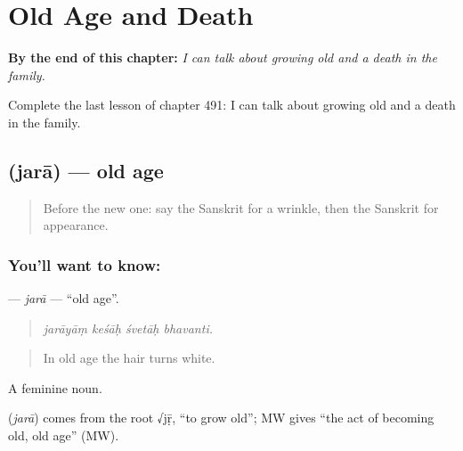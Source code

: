 
\chapter{Old Age and Death}
\label{ch:sa-old-age-and-death}

\begin{chapteropening}
\textbf{By the end of this chapter:} \emph{I can talk about growing old and a death in the family.}

Complete the last lesson of chapter 491: I can talk about growing old and a death in the family.
\end{chapteropening}

\section[\texorpdfstring{\sk{जरा} (jarā)}{जरा (jarā)}]{ (jarā) — old age}

\label{lesson:SA-C491-jara}



\begin{quote}
Before the new one: say the Sanskrit for a wrinkle, then the Sanskrit for appearance.
\end{quote}

\subsection*{You'll want to know: }
\textbf{} — \emph{jarā} — \textquotedblleft{}old age\textquotedblright{}.

\begin{quote}
   
\end{quote}

\begin{quote}
\emph{jarāyāṃ keśāḥ śvetāḥ bhavanti.}
\end{quote}

\begin{quote}
In old age the hair turns white.
\end{quote}

A feminine noun.

\begin{cousinweb}
\textbf{} (\emph{jarā}) comes from the root √jṝ, \textquotedblleft{}to grow old\textquotedblright{}; MW gives \textquotedblleft{}the act of becoming old, old age\textquotedblright{} (MW).
\end{cousinweb}

